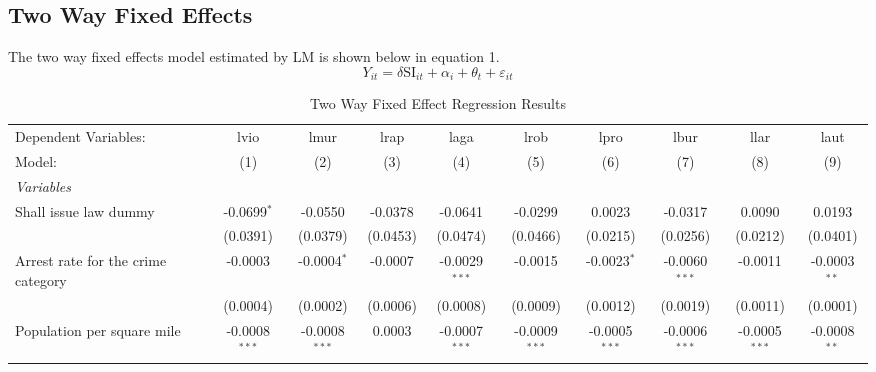 \documentclass{article}
\begin{document}
\subsection*{Two Way Fixed Effects}
The two way fixed effects model estimated by LM is shown below in equation 1.
\begin{equation}
Y_{it} = \delta\text{SI}_{it} + \alpha_i + \theta_t + \varepsilon_{it}
\end{equation}

    \scriptsize
\begin{landscape}
\begin{longtable}{@{\extracolsep{5pt}}lccccccccc}
  \caption{Two Way Fixed Effect Regression Results} 
  \label{tab:twfe}
   \tabularnewline \midrule \midrule
   Dependent Variables: & lvio                          & lmur                    & lrap                          & laga                         & lrob                        & lpro                         & lbur                    & llar                          & laut\\  
   Model:               & (1)                           & (2)                     & (3)                           & (4)                          & (5)                         & (6)                          & (7)                     & (8)                           & (9)\\  
   \midrule
   \emph{Variables}\\
   Shall issue law dummy               & -0.0699$^{*}$                 & -0.0550                 & -0.0378                       & -0.0641                      & -0.0299                     & 0.0023                       & -0.0317                 & 0.0090                        & 0.0193\\   
                        & (0.0391)                      & (0.0379)                & (0.0453)                      & (0.0474)                     & (0.0466)                    & (0.0215)                     & (0.0256)                & (0.0212)                      & (0.0401)\\
Arrest rate for the crime category & -0.0003 & -0.0004$^{*}$ & -0.0007 & -0.0029$^{***}$ & -0.0015& -0.0023$^{*}$ &  -0.0060$^{***}$& -0.0011 &-0.0003$^{**}$\\
 & (0.0004)&(0.0002) &(0.0006) & (0.0008)&(0.0009)& (0.0012)& (0.0019)& (0.0011)& (0.0001)\\   
  Population per square mile              & -0.0008$^{***}$               & -0.0008$^{***}$         & 0.0003                        & -0.0007$^{***}$              & -0.0009$^{***}$             & -0.0005$^{***}$              & -0.0006$^{***}$         & -0.0005$^{***}$               & -0.0008$^{**}$\\   

\end{longtable}
\end{landscape}
\end{document}
